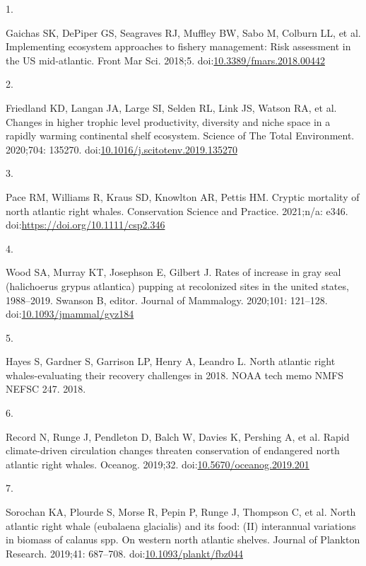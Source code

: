 \documentclass[
  10pt,
]{article}
\newlength{\cslhangindent}
\newlength{\csllabelwidth}
\newlength{\cslentryspacingunit} %
\newenvironment{CSLReferences}[2] %
 {%
  \setlength{\parindent}{0pt}
  \ifodd #1
  \let\oldpar\par
  \def\par{\hangindent=\cslhangindent\oldpar}
  \fi
  \setlength{\parskip}{#2\cslentryspacingunit}
 }%
 {}
\newcommand{\CSLLeftMargin}[1]{\parbox[t]{\csllabelwidth}{#1}}
\newcommand{\CSLRightInline}[1]{\parbox[t]{\linewidth - \csllabelwidth}{#1}\break}
\begin{document}
\hypertarget{refs}{}
\begin{CSLReferences}{0}{0}
\leavevmode{}%
\CSLLeftMargin{1. }%
\CSLRightInline{Gaichas SK, DePiper GS, Seagraves RJ, Muffley BW, Sabo M, Colburn LL, et al. Implementing ecosystem approaches to fishery management: Risk assessment in the {US} mid-atlantic. Front Mar Sci. 2018;5. doi:\href{https://doi.org/10.3389/fmars.2018.00442}{10.3389/fmars.2018.00442}}

\leavevmode{}%
\CSLLeftMargin{2. }%
\CSLRightInline{Friedland KD, Langan JA, Large SI, Selden RL, Link JS, Watson RA, et al. Changes in higher trophic level productivity, diversity and niche space in a rapidly warming continental shelf ecosystem. Science of The Total Environment. 2020;704: 135270. doi:\href{https://doi.org/10.1016/j.scitotenv.2019.135270}{10.1016/j.scitotenv.2019.135270}}

\leavevmode{}%
\CSLLeftMargin{3. }%
\CSLRightInline{Pace RM, Williams R, Kraus SD, Knowlton AR, Pettis HM. Cryptic mortality of north atlantic right whales. Conservation Science and Practice. 2021;n/a: e346. doi:\url{https://doi.org/10.1111/csp2.346}}

\leavevmode{}%
\CSLLeftMargin{4. }%
\CSLRightInline{Wood SA, Murray KT, Josephson E, Gilbert J. Rates of increase in gray seal (halichoerus grypus atlantica) pupping at recolonized sites in the united states, 1988--2019. Swanson B, editor. Journal of Mammalogy. 2020;101: 121--128. doi:\href{https://doi.org/10.1093/jmammal/gyz184}{10.1093/jmammal/gyz184}}

\leavevmode{}%
\CSLLeftMargin{5. }%
\CSLRightInline{Hayes S, Gardner S, Garrison LP, Henry A, Leandro L. North atlantic right whales-evaluating their recovery challenges in 2018. {NOAA} tech memo {NMFS} {NEFSC} 247. 2018. }

\leavevmode{}%
\CSLLeftMargin{6. }%
\CSLRightInline{Record N, Runge J, Pendleton D, Balch W, Davies K, Pershing A, et al. Rapid climate-driven circulation changes threaten conservation of endangered north atlantic right whales. Oceanog. 2019;32. doi:\href{https://doi.org/10.5670/oceanog.2019.201}{10.5670/oceanog.2019.201}}

\leavevmode{}%
\CSLLeftMargin{7. }%
\CSLRightInline{Sorochan KA, Plourde S, Morse R, Pepin P, Runge J, Thompson C, et al. North atlantic right whale (eubalaena glacialis) and its food: ({II}) interannual variations in biomass of calanus spp. On western north atlantic shelves. Journal of Plankton Research. 2019;41: 687--708. doi:\href{https://doi.org/10.1093/plankt/fbz044}{10.1093/plankt/fbz044}}


\end{CSLReferences}
\end{document}
